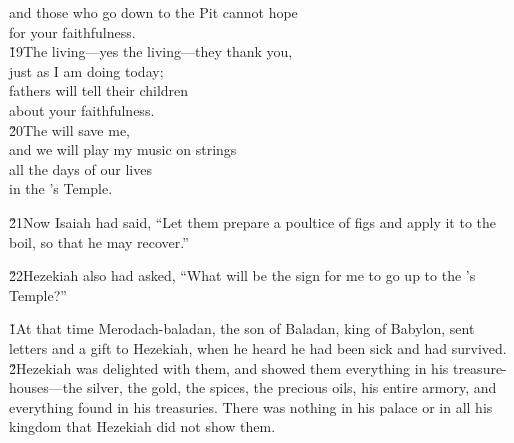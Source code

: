 \begin{poetry}
\poeml and those who go down to the Pit cannot hope \\
\poemll    for your faithfulness. \\
\poeml \v{19}The living---yes the living---they thank you, \\
\poemll    just as I am doing today; \\
\poeml fathers will tell their children \\
\poemll    about your faithfulness. \\
\poeml \v{20}The  will save me, \\
\poemll    and we will play my music on strings \\
\poeml all the days of our lives \\
\poemll    in the 's Temple.
\end{poetry}

\v{21}Now Isaiah had said, ``Let them prepare a poultice of figs and apply it to the boil, so that he may recover.''

\v{22}Hezekiah also had asked, ``What will be the sign for me to go up to the 's Temple?''

\v{1}At that time Merodach-baladan, the son of Baladan, king of Babylon, sent letters and a gift to Hezekiah, when he heard he had been sick and had survived. \v{2}Hezekiah was delighted with them, and showed them everything in his treasure-houses---the silver, the gold, the spices, the precious oils, his entire armory, and everything found in his treasuries. There was nothing in his palace or in all his kingdom that Hezekiah did not show them.

